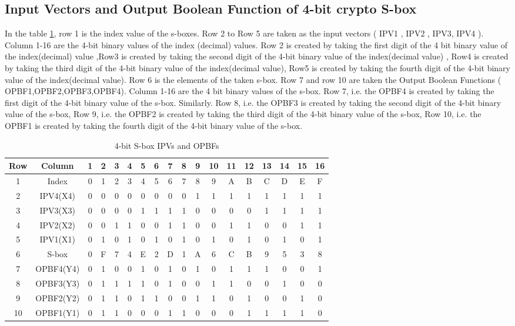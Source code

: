 \documentclass[12pt]{article}
\begin{document}
\subsection{Input Vectors and Output Boolean Function of 4-bit crypto S-box}
In the table \ref{table:7}, row 1 is the index value of the s-boxes. Row 2 to Row 5 are taken as the input vectors ( IPV1 , IPV2 , IPV3, IPV4 ). Column 1-16 are the 4-bit binary values of the index (decimal) values. Row 2 is created by taking the first digit of the 4 bit binary value of the index(decimal) value ,Row3 is created by taking the second digit of the 4-bit binary value of the index(decimal value) , Row4 is created by taking the third digit of the 4-bit binary value of the index(decimal value), Row5 is created by taking the fourth digit of the 4-bit binary value of the index(decimal value). Row 6 is the elements of the taken s-box. Row 7 and row 10 are taken the Output Boolean Functions ( OPBF1,OPBF2,OPBF3,OPBF4). Column 1-16 are the 4 bit binary values of the s-box. Row 7, i.e. the OPBF4 is created by taking the first digit of the 4-bit binary value of the s-box. Similarly. Row 8, i.e. the OPBF3 is created by taking the second digit of the 4-bit binary value of the s-box, Row 9, i.e. the OPBF2 is created by taking the third digit of the 4-bit binary value of the s-box, Row 10, i.e. the OPBF1 is created by taking the fourth digit of the 4-bit binary value of the s-box. 
\begin{table}[!h]
    \centering
    \begin{tabular}{|c|c|c|c|c|c|c|c|c|c|c|c|c|c|c|c|c|c|}
        \hline
        Row & Column & 1 & 2 & 3 & 4 & 5 & 6 & 7 & 8 & 9 & 10 & 11 & 12 & 13 & 14 & 15 & 16 \\
        \hline
        1 & Index & 0 & 1 & 2 & 3 & 4 & 5 & 6 & 7 & 8 & 9 & A & B & C & D & E & F \\
        \hline
        2 & IPV4(X4) & 0 & 0 & 0 & 0 & 0 & 0 & 0 & 0 & 1 & 1 & 1 & 1 & 1 & 1 & 1 & 1 \\
        \hline
        3 & IPV3(X3) & 0 & 0 & 0 & 0 & 1 & 1 & 1 & 1 & 0 & 0 & 0 & 0 & 1 & 1 & 1 & 1 \\
        \hline
        4 & IPV2(X2) & 0 & 0 & 1 & 1 & 0 & 0 & 1 & 1 & 0 & 0 & 1 & 1 & 0 & 0 & 1 & 1 \\
        \hline
        5 & IPV1(X1) & 0 & 1 & 0 & 1 & 0 & 1 & 0 & 1 & 0 & 1 & 0 & 1 & 0 & 1 & 0 & 1 \\
        \hline
        6 & S-box & 0 & F & 7 & 4 & E & 2 & D & 1 & A & 6 & C & B & 9 & 5 & 3 & 8 \\
        \hline
        7 & OPBF4(Y4) & 0 & 1 & 0 & 0 & 1 & 0 & 1 & 0 & 1 & 0 & 1 & 1 & 1 & 0 & 0 & 1 \\
        \hline
        8 & OPBF3(Y3) & 0 & 1 & 1 & 1 & 1 & 0 & 1 & 0 & 0 & 1 & 1 & 0 & 0 & 1 & 0 & 0 \\
        \hline
        9 & OPBF2(Y2) & 0 & 1 & 1 & 0 & 1 & 1 & 0 & 0 & 1 & 1 & 0 & 1 & 0 & 0 & 1 & 0 \\
        \hline
        10 & OPBF1(Y1) & 0 & 1 & 1 & 0 & 0 & 0 & 1 & 1 & 0 & 0 & 0 & 1 & 1 & 1 & 1 & 0 \\
        \hline
    \end{tabular}
    \caption{4-bit S-box IPVs and OPBFs}
    \label{table:7}
\end{table}
\end{document}
